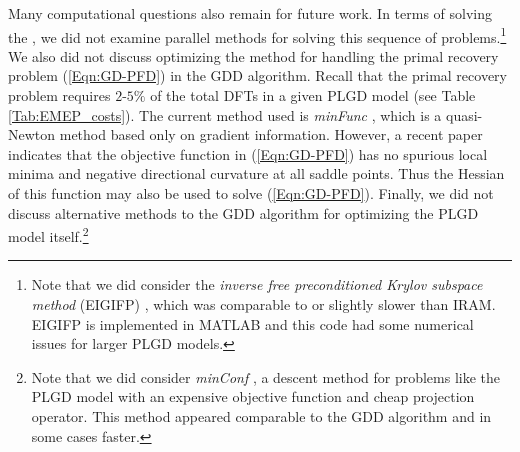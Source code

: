 Many computational questions also remain for future work.
In terms of solving the \emep, we did not examine parallel methods for solving this sequence of problems.\footnote{
Note that we did consider the \textit{inverse free preconditioned Krylov subspace method} (EIGIFP) \cite{golub2002inverse}, which was comparable to or slightly slower than IRAM.  EIGIFP is implemented in MATLAB and this code had some numerical issues for larger PLGD models.
}
We also did not discuss optimizing the method for handling the primal recovery problem (\ref{Eqn:GD-PFD}) in the GDD algorithm.
Recall that the primal recovery problem requires $2$-$5\%$ of the total DFTs in a given PLGD model (see Table \ref{Tab:EMEP_costs}).
The current method used is \textit{minFunc} \cite{schmidt2005minFunc}, which is a quasi-Newton method based only on gradient information.
However, a recent paper \cite{sun2016geometric} indicates that the objective function in (\ref{Eqn:GD-PFD}) has no spurious local minima and negative directional curvature at all saddle points.
Thus the Hessian of this function may also be used to solve (\ref{Eqn:GD-PFD}).
Finally, we did not discuss alternative methods to the GDD algorithm for optimizing the PLGD model itself.\footnote{
Note that we did consider \textit{minConf} \cite{schmidt2008minConf}, a descent method for problems like the PLGD model with an expensive objective function and cheap projection operator.  This method appeared comparable to the GDD algorithm and in some cases faster.
}






